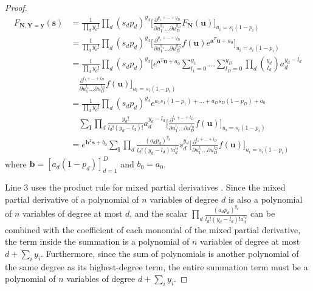 \documentclass{article}
\begin{document}
\begin{proof}

\begin{align*}
F_{\mathbf{N}, \mathbf{Y} = \mathbf{y}}(\mathbf{s})
&= \frac{1}{\prod_d y_d!} \prod_d (s_dp_d)^{y_d} \bigg[ \frac{\partial^{y_1+\ldots+y_D}}{\partial u_1^{y_1} \ldots \partial u_D^{y_D}} F_{\mathbf{N}}(\mathbf{u}) \bigg]_{u_i = s_i(1-p_i)} \\
&= \frac{1}{\prod_d y_d!} \prod_d (s_dp_d)^{y_d} \bigg[ \frac{\partial^{y_1+\ldots+y_D}}{\partial u_1^{y_1} \ldots \partial u_D^{y_D}} f(\mathbf{u}) e^{\mathbf{a}^T \mathbf{u} + a_0} \bigg]_{u_i = s_i(1-p_i)} \\
&= \frac{1}{\prod_d y_d!} \prod_d (s_dp_d)^{y_d} \bigg[ e^{\mathbf{a}^T \mathbf{u} + a_0} \sum_{l_1=0}^{y_1} \ldots \sum_{l_D=0}^{y_D} \prod_d {y_d \choose l_d} a_d^{y_d - l_d} \\
& \quad \frac{\partial^{l_1+\ldots+l_D}}{\partial u_1^{l_1} \ldots \partial u_D^{l_D}} f(\mathbf{u}) \bigg]_{u_i = s_i(1-p_i)} \\
&= \frac{1}{\prod_d y_d!} \prod_d (s_dp_d)^{y_d} e^{a_1 s_1 (1-p_1) + \ldots + a_D s_D (1-p_D) + a_0} \\
& \quad \sum_{\mathbf{l}} \prod_d \frac{y_d!}{l_d! (y_d - l_d)!} a_d^{y_d - l_d} \bigg[ \frac{\partial^{l_1+\ldots+l_D}}{\partial u_1^{l_1} \ldots \partial u_D^{l_D}} f(\mathbf{u}) \bigg]_{u_i = s_i(1-p_i)} \\
&= e^{\mathbf{b}^T \mathbf{s} + b_0} \sum_{\mathbf{l}} \prod_d \frac{(a_dp_d)^{y_d}}{l_d! (y_d - l_d)! a_d^{l_d}} s_d^{y_d} \bigg[ \frac{\partial^{l_1+\ldots+l_D}}{\partial u_1^{l_1} \ldots \partial u_D^{l_D}} f(\mathbf{u}) \bigg]_{u_i = s_i(1-p_i)} 
\end{align*}
where $\mathbf{b} = [a_d(1-p_d)]_{d=1}^D$ and $b_0 = a_0$.

Line 3 uses the product rule for mixed partial derivatives \cite{hardy2006combinatorics}. Since the mixed partial derivative of a polynomial of $n$ variables of degree $d$ is also a polynomial of $n$ variables of degree at most $d$, and the scalar $\prod_d \frac{(a_dp_d)^{y_d}}{l_d! (y_d - l_d)! a_d^{l_d}}$ can be combined with the coefficient of each monomial of the mixed partial derivative, the term inside the summation is a polynomial of $n$ variables of degree at most $d + \sum_i y_i$. Furthermore, since the sum of polynomials is another polynomial of the same degree as its highest-degree term, the entire summation term must be a polynomial of $n$ variables of degree $d + \sum_i y_i$.

\end{proof}
\end{document}
